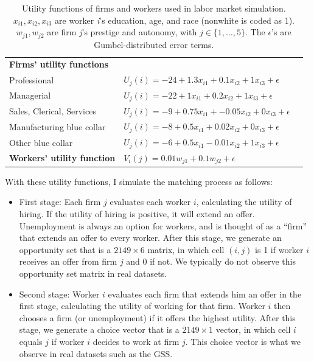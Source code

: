 \begin{table}[!ht]
\centering
\caption[Utility functions used in labor market simulations.]{Utility functions
  of firms and workers used in labor market simulation. $x_{i1}, x_{i2}, x_{i3}$ are worker \textit{i}'s education, age, and race (nonwhite is coded as 1). $w_{j1}, w_{j2}$ are firm \textit{j}'s prestige and autonomy, with $j \in \{1, \dots, 5\}$. The $\epsilon$'s are Gumbel-distributed error terms.}
\label{tab:sim_labor_nojobs_utility_functions}
\begin{tabular}{lll}
\\[-1.8ex]\hline
\textbf{Firms' utility functions}  &                                                                                     \\
Professional                         & $U_{j}(i) = -24 + 1.3 x_{i1} + 0.1 x_{i2} + 1 x_{i3} + \epsilon$         \\
Managerial                           & $U_{j}(i) = -22 + 1 x_{i1} + 0.2 x_{i2} + 1 x_{i3} + \epsilon$     \\
Sales, Clerical, Services            & $U_{j}(i) = -9 + 0.75 x_{i1} + -0.05 x_{i2} + 0 x_{i3} + \epsilon$ \\
Manufacturing blue collar            & $U_{j}(i) = -8 + 0.5 x_{i1} + 0.02 x_{i2} + 0 x_{i3} + \epsilon$   \\
Other blue collar                    & $U_{j}(i) = -6 + 0.5 x_{i1} - 0.01 x_{i2} + 1 x_{i3} + \epsilon$   \\
  \hline
\textbf{Workers' utility function} & $V_{i}(j) = 0.01 w_{j1} + 0.1 w_{j2} + \epsilon$                   \\
  \hline
\end{tabular}
\end{table}

With these utility functions, I simulate the matching process as follows:

\begin{itemize}
\item{First stage:} Each firm $j$ evaluates each worker $i$, calculating the utility of
  hiring. If the utility of hiring is positive, it will extend an offer.
  Unemployment is always an option for workers, and is thought of as a ``firm''
  that extends an offer to every worker. After
  this stage, we generate an opportunity set that is a $2149 \times 6$ matrix,
  in which cell $(i, j)$ is 1 if worker $i$ receives an offer from firm $j$ and
  0 if not. We typically do not observe this opportunity set matrix in real datasets.
\item{Second stage:} Worker $i$ evaluates each firm that extends him an offer in
  the first stage, calculating the utility of working for that firm. Worker $i$
  then chooses a firm (or unemployment) if it offers the highest utility. After this
  stage, we generate a choice vector that is a $2149 \times 1$ vector, in which
  cell $i$ equals $j$ if worker $i$ decides to work at firm $j$. This choice
  vector is what we observe in real datasets such as the GSS.
\end{itemize}

